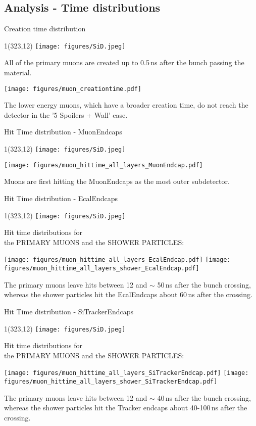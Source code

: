 \documentclass[xcolor={dvipsnames}]{beamer}
\newcommand{\sidlogo}{
  \setlength{\TPHorizModule}{1pt}
  \setlength{\TPVertModule}{1pt}
  \begin{textblock}{1}(323,12)
   \texttt{[image: figures/SiD.jpeg]}
  \end{textblock}
  }
\begin{document}
\subsection{Analysis - Time distributions}
\begin{frame}{Creation time distribution}
\sidlogo
All of the primary muons are created up to 0.5\,ns after the bunch passing the material.
 \begin{center}
\texttt{[image: figures/muon\_creationtime.pdf]}
\end{center}
The lower energy muons, which have a broader creation time, do not reach the detector in the '5 Spoilers + Wall' case.
\end{frame}
\begin{frame}{Hit Time distribution - \small MuonEndcaps}
\sidlogo
 \begin{center}
\texttt{[image: figures/muon\_hittime\_all\_layers\_MuonEndcap.pdf]}
\end{center}
Muons are first hitting the MuonEndcaps as the most outer subdetector.
\end{frame}
\begin{frame}{Hit Time distribution - \small EcalEndcaps}
\sidlogo
Hit time distributions for \\
\hspace*{0.6cm} the PRIMARY MUONS and the SHOWER PARTICLES:
 \begin{center}
\texttt{[image: figures/muon\_hittime\_all\_layers\_EcalEndcap.pdf]}
\texttt{[image: figures/muon\_hittime\_all\_layers\_shower\_EcalEndcap.pdf]}
\end{center}
The primary muons leave hits between 12 and $\sim$ 50\,ns after the bunch crossing, whereas the shower particles hit the EcalEndcaps about 60\,ns after the crossing.
\end{frame}
\begin{frame}{Hit Time distribution - \small SiTrackerEndcaps}
\sidlogo
Hit time distributions for \\
\hspace*{0.6cm} the PRIMARY MUONS and the SHOWER PARTICLES:
 \begin{center}
\texttt{[image: figures/muon\_hittime\_all\_layers\_SiTrackerEndcap.pdf]}
\texttt{[image: figures/muon\_hittime\_all\_layers\_shower\_SiTrackerEndcap.pdf]}
\end{center}
The primary muons leave hits between 12 and $\sim$ 40\,ns after the bunch crossing, whereas the shower particles hit the Tracker endcaps about 40-100\,ns after the crossing.
\end{frame}
\end{document}
